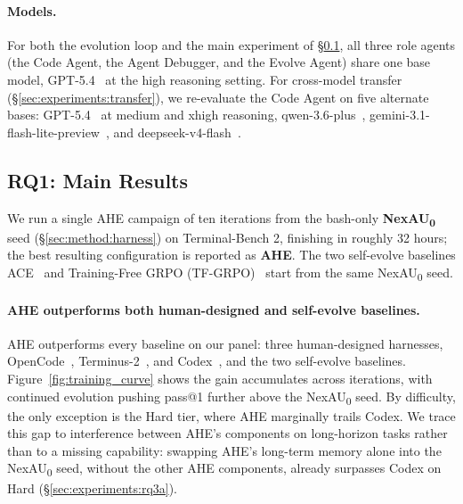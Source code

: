 \paragraph{Models.}
For both the evolution loop and the main experiment of \S\ref{sec:experiments:main}, all three role agents (the Code Agent, the Agent Debugger, and the Evolve Agent) share one base model, GPT-5.4~\citep{openaiIntroducingGPT542026} at the high reasoning setting. 
For cross-model transfer (\S\ref{sec:experiments:transfer}), we re-evaluate the Code Agent on five alternate bases: GPT-5.4~\citep{openaiIntroducingGPT542026} at medium and xhigh reasoning, qwen-3.6-plus~\citep{teamQwen36PlusRealWorld2026,yangQwen3TechnicalReport2025a}, gemini-3.1-flash-lite-preview~\citep{googleGemini31FlashLiteModelCard2026}, and deepseek-v4-flash~\citep{DeepSeek_V4pdfDeepseekaiDeepSeekV4Pro2026}.

\subsection{RQ1: Main Results}
\label{sec:experiments:main}

% 


We run a single AHE campaign of ten iterations from the bash-only \textbf{NexAU\textsubscript{0}} seed (\S\ref{sec:method:harness}) on Terminal-Bench 2, finishing in roughly 32 hours; the best resulting configuration is reported as \textbf{AHE}. The two self-evolve baselines ACE~\citep{zhangAgenticContextEngineering2025a} and Training-Free GRPO (TF-GRPO)~\citep{caiTrainingFreeGroupRelative2025} start from the same NexAU\textsubscript{0} seed.

\paragraph{AHE outperforms both human-designed and self-evolve baselines.}
AHE outperforms every baseline on our panel: three human-designed harnesses, OpenCode~\citep{anomalyOpencodeOpenSource2025}, Terminus-2~\citep{harborTerminus22026}, and Codex~\citep{openaiCodexCLI2025}, and the two self-evolve baselines.
Figure~\ref{fig:training_curve} shows the gain accumulates across iterations, with continued evolution pushing pass@1 further above the NexAU\textsubscript{0} seed.
By difficulty, the only exception is the Hard tier, where AHE marginally trails Codex. We trace this gap to interference between AHE's components on long-horizon tasks rather than to a missing capability: swapping AHE's long-term memory alone into the NexAU\textsubscript{0} seed, without the other AHE components, already surpasses Codex on Hard (\S\ref{sec:experiments:rq3a}).

